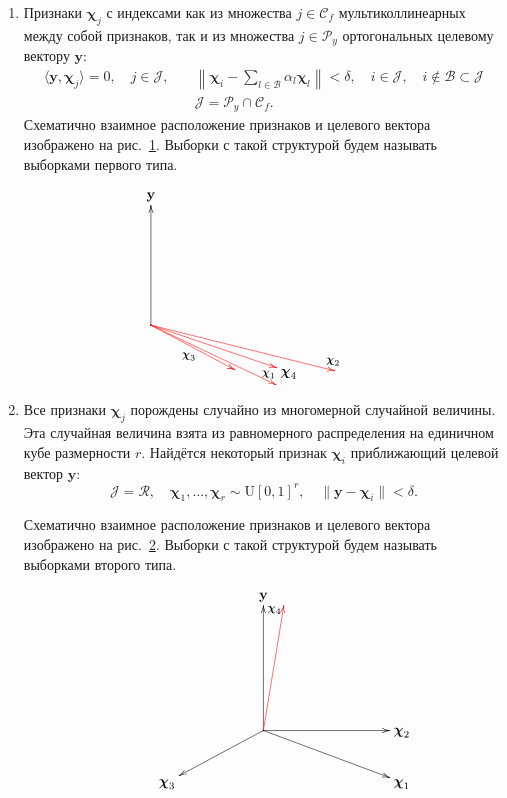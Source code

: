 \documentclass[a4paper,12pt]{article}
\newcommand{\by}{\mathbf{y}}
\newcommand{\bchi}{\boldsymbol{\chi}}
\newcommand{\calC}{\mathcal{C}}
\newcommand{\calP}{\mathcal{P}}
\newcommand{\calR}{\mathcal{R}}
\newcommand{\calJ}{\mathcal{J}}
\begin{document}
\begin{enumerate}
\item Признаки $\bchi_j$ с индексами как из множества $ j \in \calC_f$ мультиколлинеарных между собой признаков, так и из множества $ j \in \calP_y$ ортогональных целевому вектору $\by$:
\begin{equation}
\begin{split}
\langle \by, \bchi_j \rangle = 0, \quad j \in \calJ, \quad & 
\left \| \bchi_i - \sum\limits_{l \in \mathcal{B}} \alpha_l\bchi_l \right \| < \delta, \quad i \in \calJ, \quad i \not\in \mathcal{B} \subset \calJ \\
& \calJ = \calP_y \cap \calC_f.
\end{split}
\label{eq:ortcol}
\end{equation}
Схематично взаимное расположение признаков и целевого вектора изображено на рис.~\ref{fig:ortcol}. Выборки с такой структурой будем называть выборками первого типа.  
\begin{figure}[!h]
\begin{equation*}
\xymatrix{
\by & \\
& \\
& \\
*=0{.}\ar@[red][rrrd]_>>{{\large \bchi_1}}+/0 5pt/ %
\ar[uuu] %
\ar@[red][rrrrd]^>>{{\large \bchi}_2}+/va(-90) 10pt/ %
\ar@[red][rrrd]+/va(-135) 13pt/ %
\ar@[red][rrd]_{\large{\bchi}_3}!/va(-90) 15pt/ & & & & & \\
& & & \bchi_4 & &
}
\end{equation*}
\caption{}
\label{fig:ortcol}
\end{figure}

\item Все признаки $\bchi_j$ порождены случайно из многомерной случайной величины. Эта случайная величина взята из равномерного распределения на единичном кубе размерности $r$. Найдётся некоторый признак $\bchi_i$ приближающий целевой вектор $\by$:
\begin{equation}
\calJ = \calR, \quad \bchi_1,\ldots,\bchi_r \sim \mathcal{\mathrm{U}}[0, 1]^r, \quad \|\by - \bchi_i\| < \delta.
\label{eq:random}
\end{equation}

Схематично взаимное расположение признаков и целевого вектора изображено на рис.~\ref{fig:random}. Выборки с такой структурой будем называть выборками второго типа.  

\begin{figure}[!h]
\begin{equation*}
\xymatrix{
& & & \by & & & \\
& & &     & & & \\
& & &     & & & \\
& & & *=0{.}\ar[uuu]_>>{\large \bchi_4} %
\ar@[red][uuu]!/va(70) 80pt/ %
\ar[rrrd] %
\ar[rrr] %
\ar[lld] & & & \bchi_2 \\
& \bchi_3 & & & & & \bchi_1
}
\end{equation*}
\caption{}
\label{fig:random}
\end{figure}


\end{enumerate}
\end{document}
